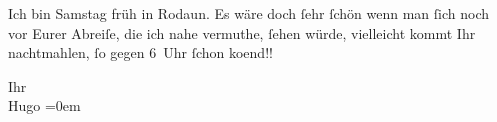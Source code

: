 \pstart
           \noindent{}{\pb}Ich bin Samstag{ }früh in Rodaun. Es wäre doch{ }ſehr{ }ſchön wenn man{ }ſich noch vor Eurer Abreiſe, die ich nahe vermuthe,{ }ſehen würde,
               vielleicht kommt Ihr \label{K_L01366-1v}\label{K_L01366-1} nachtmahlen,{ }ſo gegen 6 Uhr{ }ſchon
                  ko{\geminationm}end!!\pend
           
\pstart
           Ihr{\\[\baselineskip]}\spacefill\mbox{Hugo}\pend
           \leftskip=0em{}\endnumbering{}  \newcommand{\dateiname}{L01366}\newcommand{\titel}{Hugo von Hofmannsthal an Arthur Schnitzler, 28. 1. 1904}\newcommand{\editorInnen}{Martin Anton Müller und Gerd-Hermann Susen}
